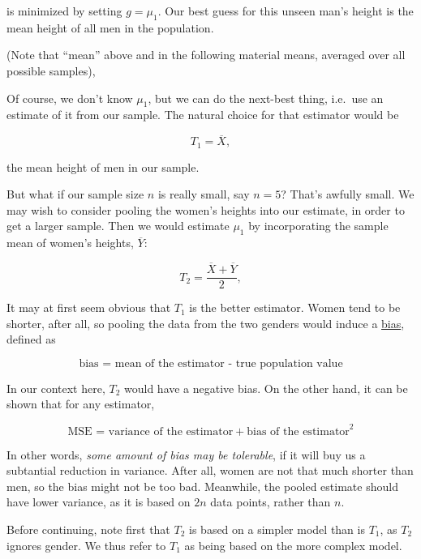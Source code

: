 is minimized by setting $g = \mu_1$.  Our best guess for this unseen
man's height is the mean height of all men in the population.

(Note that ``mean'' above and in the following material  means, averaged
over all possible samples), 

Of course, we don't know $\mu_1$, but we can do the next-best thing,
i.e.\ use an estimate of it from our sample.  The natural choice for
that estimator would be

\begin{equation}
T_1 = \overline{X},
\end{equation}

the mean height of men in our sample.

But what if our sample size $n$ is really small, say $n = 5$?  That's
awfully small.  We may wish to consider pooling the women's heights into
our estimate, in order to get a larger sample.  Then we would estimate
$\mu_1$ by incorporating the sample mean of women's heights,
$\overline{Y}$:

\begin{equation}
T_2 = \frac{\overline{X}+\overline{Y}}{2}, 
\end{equation}

It may at first seem obvious that $T_1$ is the better estimator.  Women
tend to be shorter, after all, so pooling the data from the two genders
would induce a \underline{bias}, defined as  

\begin{equation}
\textrm{bias = mean of the estimator - true population value}
\end{equation}

In our context here, $T_2$ would have a negative bias.  On the other
hand, it can be shown that for any estimator,

\begin{equation}
\textrm{MSE = variance of the estimator} + \textrm{bias of the
estimator} ^2
\end{equation}

In other words, {\it some amount of bias may be tolerable}, if it will
buy us a subtantial reduction in variance.  After all, women are not
that much shorter than men, so the bias might not be too bad.
Meanwhile, the pooled estimate should have lower variance, as it is
based on $2n$ data points, rather than $n$.

Before continuing, note first that $T_2$ is based on a simpler model
than is $T_1$, as $T_2$ ignores gender.  We thus refer to $T_1$ as being
based on the more complex model.

